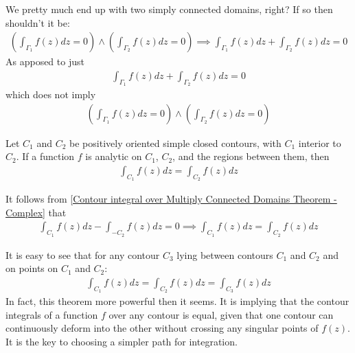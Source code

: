 \documentclass[12pt, english]{book}
\makeatletter
\renewenvironment{proof}[1][\proofname]{\par
	\pushQED{\qed}%
	\normalfont \topsep6\p@\@plus6\p@\relax
	\list{}{%
		\settowidth{\leftmargin}{\itshape\proofname:\hskip\labelsep}%
		\setlength{\labelwidth}{0pt}%
		\setlength{\itemindent}{-\leftmargin}%
	}%
	\item[\hskip\labelsep\itshape#1\@addpunct{:}]\ignorespaces
}{%
	\popQED\endlist\@endpefalse
}
\makeatother
\begin{document}
	\begin{question}
		We pretty much end up with two simply connected domains, right? If so then shouldn't it be:
		\begin{align*}
			\left( \int_{\Gamma_1} f(z) dz = 0 \right) \land \left( \int_{\Gamma_2} f(z) dz = 0 \right) \implies \int_{\Gamma_1} f(z) dz + \int_{\Gamma_2} f(z) dz = 0
		\end{align*}
		As apposed to just 
		\begin{align*}
			\int_{\Gamma_1} f(z) dz + \int_{\Gamma_2} f(z) dz = 0
		\end{align*}
		which does not imply
		\begin{align*}
			\left( \int_{\Gamma_1} f(z) dz = 0 \right) \land \left( \int_{\Gamma_2} f(z) dz = 0 \right)
		\end{align*}
	\end{question}

	\begin{corollary}
		\label{Principle of Deformation of Paths Corollary - Complex}
		Let \(C_1\) and \(C_2\) be positively oriented simple closed contours, with \(C_1\) interior to \(C_2\). If a function \(f\) is analytic on \(C_1\), \(C_2\), and the regions between them, then 
		\begin{align*}
			\int_{C_1} f(z) dz = \int_{C_2} f(z) dz
		\end{align*}
	\end{corollary}
	\begin{proof}
		It follows from \cref{Contour integral over Multiply Connected Domains Theorem - Complex} that 
		\begin{align*}
			\int_{C_1} f(z) dz - \int_{-C_2} f(z) dz = 0
			\implies \int_{C_1} f(z) dz = \int_{C_2} f(z) dz
		\end{align*}
	\end{proof}

	\begin{observation}
		It is easy to see that for any contour \(C_3\) lying between contours \(C_1\) and \(C_2\) and on points on \(C_1\) and \(C_2\):
		\begin{align*}
			\int_{C_1} f(z) dz = \int_{C_2} f(z) dz = \int_{C_3} f(z) dz 
		\end{align*}
		In fact, this theorem more powerful then it seems. It is implying that the contour integrals of a function \(f\) over any contour is equal, given that one contour can continuously deform into the other without crossing any singular points of \(f(z)\). It is the key to choosing a simpler path for integration.
	\end{observation}
	
\end{document}
